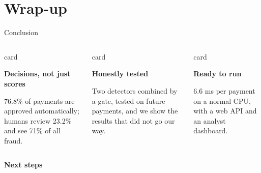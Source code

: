 \documentclass[aspectratio=169,11pt]{beamer}
\begin{document}
\section{Wrap-up}

\begin{frame}{Conclusion}
  \vspace{0.4em}
  \begin{columns}[T]
      \begin{beamercolorbox}[wd=\linewidth,sep=0.55em,rounded=true]{card}
        {\small\bfseries\color{brand}Decisions, not just scores\par}\vspace{0.3em}
        {\footnotesize 76.8\% of payments are approved automatically; humans review
        23.2\% and see 71\% of all fraud.\par}
      \end{beamercolorbox}
      \begin{beamercolorbox}[wd=\linewidth,sep=0.55em,rounded=true]{card}
        {\small\bfseries\color{brand}Honestly tested\par}\vspace{0.3em}
        {\footnotesize Two detectors combined by a gate, tested on future payments, and
        we show the results that did not go our way.\par}
      \end{beamercolorbox}
      \begin{beamercolorbox}[wd=\linewidth,sep=0.55em,rounded=true]{card}
        {\small\bfseries\color{brand}Ready to run\par}\vspace{0.3em}
        {\footnotesize 6.6 ms per payment on a normal CPU, with a web API and an analyst
        dashboard.\par}
      \end{beamercolorbox}
  \end{columns}
  \vspace{0.8em}
  \small\textbf{\color{brand}Next steps}\par
  \vspace{0.3em}
  \begin{columns}[T]
      \footnotesize

\end{columns}
\end{frame}
\end{document}
